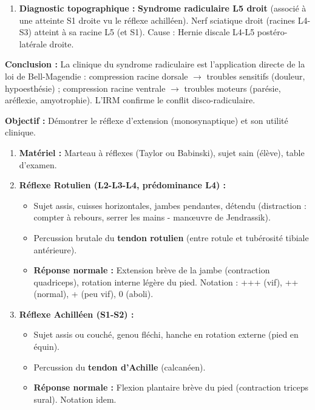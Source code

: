 \documentclass[11pt]{article}
\begin{document}
\begin{exoresolu}
\begin{enumerate}
\begin{itemize}
    \end{itemize}
    \item \textbf{Diagnostic topographique :} \textbf{Syndrome radiculaire L5 droit} (associé à une atteinte S1 droite vu le réflexe achilléen). Nerf sciatique droit (racines L4-S3) atteint à sa racine L5 (et S1). Cause : Hernie discale L4-L5 postéro-latérale droite.
\end{enumerate}
\textbf{Conclusion :} La clinique du syndrome radiculaire est l'application directe de la loi de Bell-Magendie : compression racine dorsale $\rightarrow$ troubles sensitifs (douleur, hypoesthésie) ; compression racine ventrale $\rightarrow$ troubles moteurs (parésie, aréflexie, amyotrophie). L'IRM confirme le conflit disco-radiculaire.
\end{exoresolu}

\begin{methode}
\textbf{Objectif :} Démontrer le réflexe d'extension (monosynaptique) et son utilité clinique.
\begin{enumerate}
    \item \textbf{Matériel :} Marteau à réflexes (Taylor ou Babinski), sujet sain (élève), table d'examen.
    \item \textbf{Réflexe Rotulien (L2-L3-L4, prédominance L4) :}
    \begin{itemize}
        \item Sujet assis, cuisses horizontales, jambes pendantes, détendu (distraction : compter à rebours, serrer les mains - manœuvre de Jendrassik).
        \item Percussion brutale du \textbf{tendon rotulien} (entre rotule et tubérosité tibiale antérieure).
        \item \textbf{Réponse normale :} Extension brève de la jambe (contraction quadriceps), rotation interne légère du pied. Notation : +++ (vif), ++ (normal), + (peu vif), 0 (aboli).
    \end{itemize}
    \item \textbf{Réflexe Achilléen (S1-S2) :}
    \begin{itemize}
        \item Sujet assis ou couché, genou fléchi, hanche en rotation externe (pied en équin).
        \item Percussion du \textbf{tendon d'Achille} (calcanéen).
        \item \textbf{Réponse normale :} Flexion plantaire brève du pied (contraction triceps sural). Notation idem.

\end{itemize}
\end{enumerate}
\end{methode}
\end{document}
